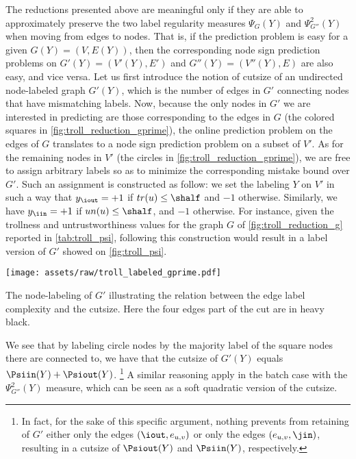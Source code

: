 The reductions presented above are meaningful only if they are able to approximately preserve the
two label regularity measures $\Psi_G(Y)$ and $\Psi^2_{G''}(Y)$ when moving from edges to nodes.
That is, if the \esp{} prediction problem is
easy for a given $G(Y) = (V,E(Y))$, then the corresponding node sign prediction problems on $G'(Y)
= (V'(Y),E')$ and $G''(Y) = (V''(Y),E)$ are also easy, and vice versa.
Let us first introduce the notion of cutsize of an undirected node-labeled graph $G'(Y)$, which is
the number of edges in $G'$ connecting nodes that have mismatching labels.
  Now, because the only nodes in $G'$ we are
  interested in predicting are those corresponding to the edges in $G$ (the colored squares in
  \autoref{fig:troll_reduction_gprime}), the online prediction problem on the edges of $G$ translates to a node
  sign prediction problem on a subset of $V'$. As for the remaining nodes in $V'$ (the circles in
  \autoref{fig:troll_reduction_gprime}), we are free to assign arbitrary labels so as to minimize the corresponding mistake
  bound over $G'$. Such an assignment is constructed as follow: we set the labeling $Y$ on $V'$ in such a
  way that $y_{\iout} = +1$ if $tr(u) \leq \shalf$ and $-1$ otherwise. Similarly, we have $y_{\iin} = +1$ if
  $un(u) \leq \shalf$,
  and $-1$ otherwise. For instance, given the trollness and untrustworthiness values for the graph $G$ of
  \autoref{fig:troll_reduction_g} reported in \autoref{tab:troll_psi}, following this construction
  would result in a label version of $G'$ showed on \autoref{fig:troll_psi}.
\begin{marginfigure}
	\centering
	\texttt{[image: assets/raw/troll\_labeled\_gprime.pdf]}
	\caption{The node-labeling of $G'$ illustrating the relation between the edge label
	  complexity and the cutsize. Here the four edges part of the cut are in heavy black.
	\label{fig:troll_psi}}
\end{marginfigure}
  We see that by labeling circle nodes by the majority label of the square nodes there are connected
  to, we have that the cutsize of $G'(Y)$ equals  $\Psiin(Y) + \Psiout(Y)$.%
  \footnote{In fact, for the sake of
  this specific argument, nothing prevents from retaining of $G'$ either only the edges
  $(\iout,e_{u,v})$ or only the edges $(e_{u,v},\jin)$, resulting in a cutsize of $\Psiout(Y)$ and
  $\Psiin(Y)$, respectively.}
  A similar reasoning apply in the batch case with the $\Psi^2_{G''}(Y)$ measure, which can be seen
  as a soft quadratic version of the cutsize.

